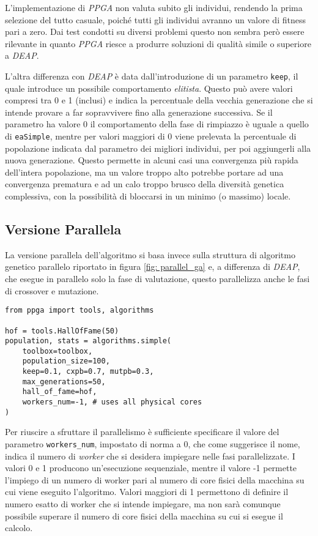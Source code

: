 L'implementazione di \textit{PPGA} non valuta subito gli individui, rendendo la
prima selezione del tutto casuale, poiché tutti gli individui avranno un valore
di fitness pari a zero. Dai test condotti su diversi problemi questo non sembra
però essere rilevante in quanto \textit{PPGA} riesce a produrre soluzioni di
qualità simile o superiore a \textit{DEAP}.

L'altra differenza con \textit{DEAP} è data dall'introduzione di un parametro
\verb|keep|, il quale introduce un possibile comportamento \textit{elitista}.
Questo può avere valori compresi tra 0 e 1 (inclusi) e indica la percentuale
della vecchia generazione che si intende provare a far sopravvivere fino alla
generazione successiva. Se il parametro ha valore 0 il comportamento della fase
di rimpiazzo è uguale a quello di \verb|eaSimple|, mentre per valori maggiori
di 0 viene prelevata la percentuale di popolazione indicata dal parametro dei
migliori individui, per poi aggiungerli alla nuova generazione. Questo permette
in alcuni casi una convergenza più rapida dell'intera popolazione, ma un valore
troppo alto potrebbe portare ad una convergenza prematura e ad un calo troppo
brusco della diversità genetica complessiva, con la possibilità di bloccarsi in
un minimo (o massimo) locale.

\subsection{Versione Parallela}

La versione parallela dell'algoritmo si basa invece sulla struttura di algoritmo
genetico parallelo riportato in figura \ref{fig: parallel_ga} e, a differenza
di \textit{DEAP}, che esegue in parallelo solo la fase di valutazione, questo
parallelizza anche le fasi di crossover e mutazione.

\begin{lstlisting}[caption={Utilizzo algoritmo parallelo PPGA}]
from ppga import tools, algorithms

hof = tools.HallOfFame(50)
population, stats = algorithms.simple(
	toolbox=toolbox,
	population_size=100,
	keep=0.1, cxpb=0.7, mutpb=0.3,
	max_generations=50,
	hall_of_fame=hof,
	workers_num=-1, # uses all physical cores
)
\end{lstlisting}

Per riuscire a sfruttare il parallelismo è sufficiente specificare il valore
del parametro \verb|workers_num|, impostato di norma a 0, che come suggerisce
il nome, indica il numero di \textit{worker} che si desidera impiegare nelle
fasi parallelizzate. I valori 0 e 1 producono un'esecuzione sequenziale, mentre
il valore -1 permette l'impiego di un numero di worker pari al numero di core
fisici della macchina su cui viene eseguito l'algoritmo. Valori maggiori di 1
permettono di definire il numero esatto di worker che si intende impiegare, ma
non sarà comunque possibile superare il numero di core fisici della macchina su
cui si esegue il calcolo.


